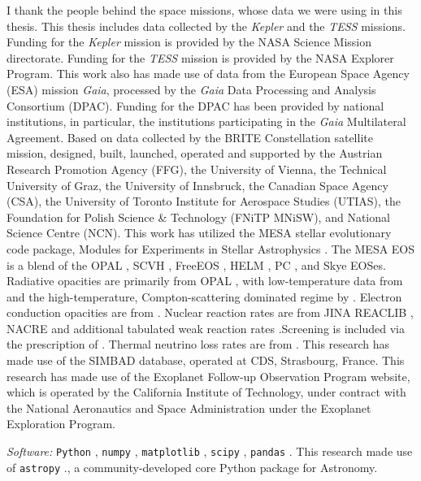I thank the people behind the space missions, whose data we were using in this thesis. This thesis includes data collected by the \textit{Kepler} and the \textit{TESS} missions. Funding for the \textit{Kepler} mission is provided by the NASA Science Mission directorate. Funding for the \textit{TESS} mission is provided by the NASA Explorer Program. 
This work also has made use of data from the European Space Agency (ESA) mission \textit{Gaia}, processed by the \textit{Gaia} Data Processing and Analysis Consortium (DPAC). Funding for the DPAC has been provided by national institutions, in particular, the institutions participating in the \textit{Gaia} Multilateral Agreement.
Based on data collected by the BRITE Constellation satellite mission, designed, built, launched, operated and supported by the Austrian Research Promotion Agency (FFG), the University of Vienna, the Technical University of Graz, the University of Innsbruck, the Canadian Space Agency (CSA), the University of Toronto Institute for Aerospace Studies (UTIAS), the Foundation for Polish Science \& Technology (FNiTP MNiSW), and National Science Centre (NCN).
This work has utilized the MESA stellar evolutionary code package, Modules for Experiments in Stellar Astrophysics
\citep[MESA][]{Paxton2011, Paxton2013, Paxton2015, Paxton2018, Paxton2019}. 
The MESA EOS is a blend of the OPAL \citep{Rogers2002}, SCVH
\citep{Saumon1995}, FreeEOS \citep{Irwin2004}, HELM \citep{Timmes2000},
PC \citep{Potekhin2010}, and Skye \citep{Jermyn2021} EOSes.
Radiative opacities are primarily from OPAL \citep{Iglesias1993,Iglesias1996}, with low-temperature data from \citet{Ferguson2005}
and the high-temperature, Compton-scattering dominated regime by
\citet{Poutanen2017}.  Electron conduction opacities are from
\citet{Cassisi2007}. Nuclear reaction rates are from JINA REACLIB \citep{Cyburt2010}, NACRE \citep{Angulo1999} and additional tabulated weak reaction rates \citet{Fuller1985,Oda1994,Langanke2000}.Screening is included via the prescription of \citet{Chugunov2007}. Thermal neutrino loss rates are from \citet{Itoh1996}.
%
This research has made use of the SIMBAD database, operated at CDS, Strasbourg, France.
%
This research has made use of the Exoplanet Follow-up Observation Program website, which is operated by the California Institute of Technology, under contract with the National Aeronautics and Space Administration under the Exoplanet Exploration Program. 
%
\par
\textit{Software:} \texttt{Python} \citep{10.5555/1593511}, 
\texttt{numpy} \citep{numpy,Harris_2020},  
\texttt{matplotlib} \citep{4160265},  
\texttt{scipy} \citep{2020SciPy-NMeth}, 
\texttt{pandas} \citep{reback2020pandas, mckinney-proc-scipy-2010}.
This research made use of \texttt{astropy} \citep{astropy:2013, astropy:2018}., a community-developed core Python package for Astronomy. 

